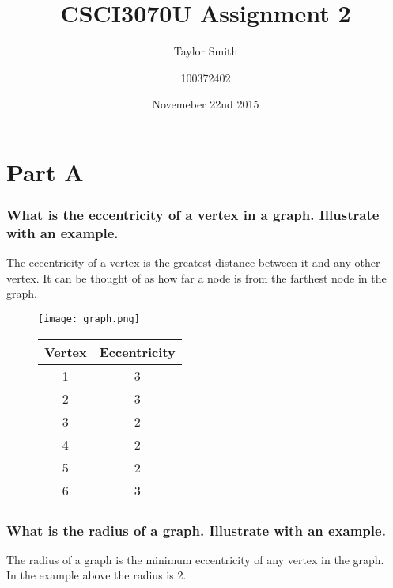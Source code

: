 \documentclass[titlepage]{article}
\begin{document}
\title{CSCI3070U Assignment 2}
\date{Novemeber 22nd 2015}
\author{Taylor Smith \and 100372402}
\maketitle
\part*{Part A}

  \section{What is the eccentricity of a vertex in a graph. Illustrate with an example.}

    The eccentricity of a vertex is the greatest distance between it and any other vertex. It can be thought of as how far a node is from the farthest node in the graph.

    \begin{figure}[ht]
      \begin{minipage}[c]{0.45\linewidth}
      \centering
      \texttt{[image: graph.png]}
      \end{minipage}
      \hspace{0.5cm}
      \begin{minipage}[b]{0.45\linewidth}
      \centering
          \begin{tabular}{| c | c |}
            \hline
            Vertex & Eccentricity \\
            \hline
            1 & 3 \\
            \hline
            2 & 3 \\
            \hline
            3 & 2 \\
            \hline
            4 & 2 \\
            \hline
            5 & 2 \\
            \hline
            6 & 3 \\
            \hline
          \end{tabular}
      \end{minipage}
    \end{figure}

  \section{What is the radius of a graph. Illustrate with an example.}

    The radius of a graph is the minimum eccentricity of any vertex in the graph.\\
    In the example above the radius is 2.
\end{document}

